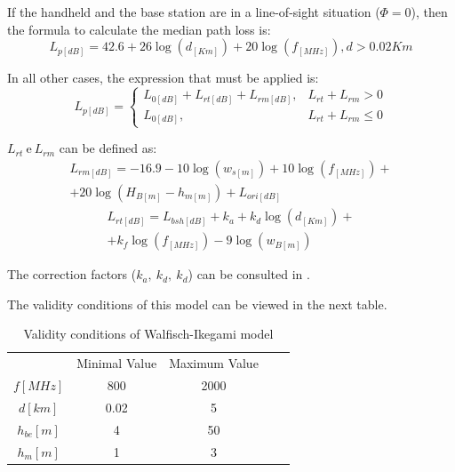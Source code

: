 \documentclass[letterpaper, 10 pt, conference]{ieeeconf}  %
\begin{document}
If the handheld and the base station are in a line-of-sight situation ($\Phi=0$), then the formula to calculate the median path loss is:
\begin{equation}
    L_{p[dB]}=42.6+26\log(d_{[Km]})+20\log(f_{[MHz]}),d>0.02Km
\end{equation}\par\noindent
In all other cases, the expression that must be applied is:
\begin{equation}
    L_{p[dB]}=
        \begin{cases}
        L_{0[dB]}+L_{rt[dB]}+L_{rm[dB]}, & \text{$L_{rt}+L_{rm}>0$}\\
        L_{0[dB]}, &\text{$L_{rt}+L_{rm}\leq0$}
        \end{cases}
\end{equation}\par\noindent
$L_{rt}\ \textrm{e}\  L_{rm}$ can be defined as:
\begin{equation}\label{equation:walfisch_ikegami_lrm}
\begin{split}
    L_{rm[dB]}=-16.9-10\log(w_{s[m]})+10\log(f_{[MHz]})+\\+20\log(H_{B[m]}-h_{m[m]})+L_{ori[dB]}
\end{split}
\end{equation}
\begin{equation}
\begin{split}
    L_{rt[dB]}=L_{bsh[dB]}+k_a+k_d\log(d_{[Km]})+\\+k_f\log(f_{[MHz]})-9\log(w_{B[m]})
\end{split}
\end{equation}\par\noindent
The correction factors ($k_a,\ k_d, \ k_d$) can be consulted in \cite{c1}.\par\noindent
The validity conditions of this model can be viewed in the next table.
\begin{table}[h]
\centering
\begin{tabular}{|c|c|c|ll}
\cline{1-3}
            & Minimal Value & Maximum Value &  &  \\ \cline{1-3}
$f [MHz] $  & 800             & 2000            &  &  \\ \cline{1-3}
$d [km]$    & 0.02               & 5              &  &  \\ \cline{1-3}
$h_{be}[m]$ & 4              & 50             &  &  \\ \cline{1-3}
$h_m [m]$   & 1               & 3              &  &  \\ \cline{1-3}
\end{tabular}
\caption{Validity conditions of Walfisch-Ikegami model}
\label{tab:validade_walsfisch-ikegami}
\end{table}
\end{document}
